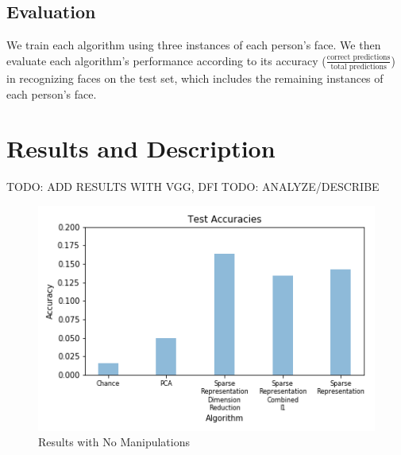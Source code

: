 \documentclass[pageno]{cos429}
\begin{document}
\subsection{Evaluation}
We train each algorithm using three instances of each person's face. We then evaluate each algorithm's performance according to its accuracy ($\frac{\textrm{correct predictions}}{\textrm{total predictions}}$) in recognizing faces on the test set, which includes the remaining instances of each person's face.

\section{Results and Description}
TODO: ADD RESULTS WITH VGG, DFI
TODO: ANALYZE/DESCRIBE

\begin{figure}
\centering
\includegraphics[scale=0.5]{../figures/results_plots/default.png}
\caption{Results with No Manipulations}
\label{fig:results_default}
\end{figure}
\end{document}
